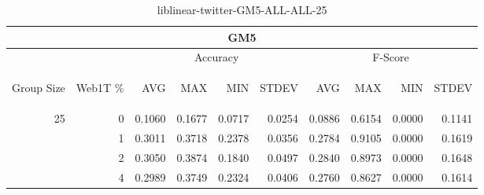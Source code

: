 \begin{center}
\begin{table}[htbp]
\begin{tabular}{ | r | r | r | r | r | r | r | r | r | r |}
\hline
\multicolumn{10}{|c|}{GM5}\\
\hline
 & & \multicolumn{4}{|c|}{Accuracy} & \multicolumn{4}{|c|}{F-Score}\\ \cline{3-10}
\begin{sideways}Group Size\end{sideways} & \begin{sideways}Web1T \%\end{sideways} & \begin{sideways}AVG\end{sideways} & \begin{sideways}MAX\end{sideways} & \begin{sideways}MIN\end{sideways} & \begin{sideways}STDEV\end{sideways} & \begin{sideways}AVG\end{sideways} & \begin{sideways}MAX\end{sideways} & \begin{sideways}MIN\end{sideways} & \begin{sideways}STDEV\end{sideways}\\
\hline
\multirow{4}{*}{25}
 & 0 & 0.1060 & 0.1677 & 0.0717 & 0.0254 & 0.0886 & 0.6154 & 0.0000 & 0.1141\\ \cline{2-10}
 & 1 & 0.3011 & 0.3718 & 0.2378 & 0.0356 & 0.2784 & 0.9105 & 0.0000 & 0.1619\\ \cline{2-10}
 & 2 & 0.3050 & 0.3874 & 0.1840 & 0.0497 & 0.2840 & 0.8973 & 0.0000 & 0.1648\\ \cline{2-10}
 & 4 & 0.2989 & 0.3749 & 0.2324 & 0.0406 & 0.2760 & 0.8627 & 0.0000 & 0.1614\\ \cline{2-10}
\hline
\end{tabular}
\caption{liblinear-twitter-GM5-ALL-ALL-25}
\end{table}
\end{center}

